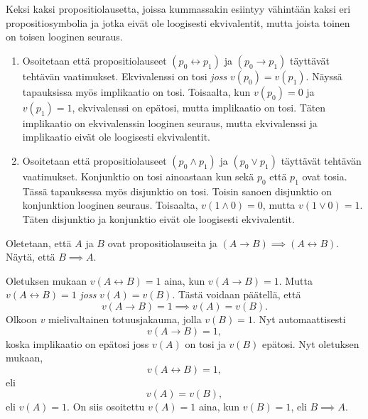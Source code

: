 \documentclass[11pt,a4paper]{amsart}
\begin{document}
\begin{exercise}
Keksi kaksi propositiolausetta, joissa kummassakin esiintyy vähintään kaksi
eri propositiosymbolia ja jotka eivät ole loogisesti ekvivalentit, mutta
joista toinen on toisen looginen seuraus.
\end{exercise}

\begin{solution}
\leavevmode\par
\begin{enumerate}
\item Osoitetaan että propositiolauseet \((p_0 \leftrightarrow p_1)\) ja
\((p_0 \rightarrow p_1)\) täyttävät tehtävän vaatimukset. Ekvivalenssi on
tosi \emph{joss} \(v(p_0) = v(p_1)\). Näyssä tapauksissa myös implikaatio
on tosi. Toisaalta, kun \(v(p_0) = 0\) ja \(v(p_1) = 1\), ekvivalenssi
on epätosi, mutta implikaatio on tosi. Täten implikaatio on ekvivalenssin
looginen seuraus, mutta ekvivalenssi ja implikaatio eivät ole loogisesti
ekvivalentit.

\item Osoitetaan että propositiolauseet \((p_0 \land p_1)\) ja
\((p_0 \lor p_1)\) täyttävät tehtävän vaatimukset. Konjunktio on tosi
ainoastaan kun sekä \(p_0\) että \(p_1\) ovat tosia. Tässä tapauksessa
myös disjunktio on tosi. Toisin sanoen disjunktio on konjunktion looginen
seuraus. Toisaalta, \(v(1 \land 0) = 0\), mutta
\(v(1 \lor 0) = 1\). Täten disjunktio ja konjunktio eivät ole loogisesti
ekvivalentit.
\end{enumerate}
\end{solution}

\begin{exercise}
Oletetaan, että \(A\) ja \(B\) ovat propositiolauseita ja
\((A \rightarrow B) \implies (A \leftrightarrow B)\).
Näytä, että \(B \implies A\).
\end{exercise}

\begin{solution}
Oletuksen mukaan \(v(A \leftrightarrow B) = 1\) aina, kun
\(v(A \rightarrow B) = 1\). Mutta \(v(A \leftrightarrow B) = 1\) \emph{joss}
\(v(A) = v(B)\). Tästä voidaan päätellä, että
\[
v(A \rightarrow B) = 1 \implies v(A) = v(B).
\]
Olkoon \(v\) mielivaltainen totuusjakauma, jolla \(v(B) = 1\). Nyt
automaattisesti
\[
v(A \rightarrow B) = 1,
\]
koska implikaatio on epätosi joss \(v(A)\) on tosi ja \(v(B)\) epätosi.
Nyt oletuksen mukaan,
\[
v(A \leftrightarrow B) = 1,
\]
eli
\[
v(A) = v(B),
\]
eli \(v(A) = 1\). On siis osoitettu \(v(A) = 1\) aina, kun \(v(B) = 1\),
eli \(B \implies A\).
\end{solution}
\end{document}
